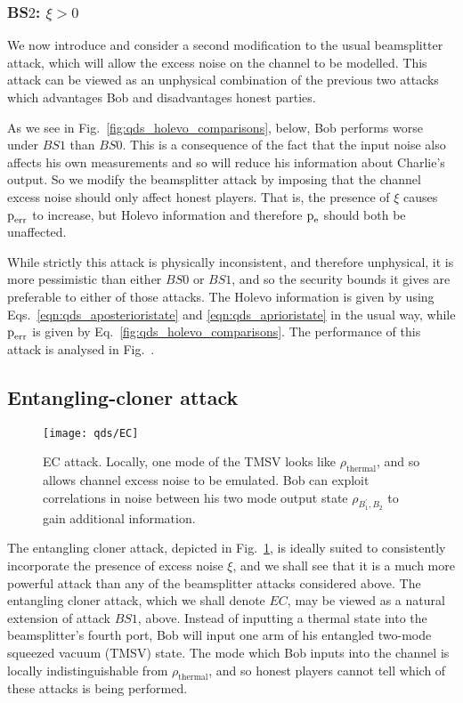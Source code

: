 \subsubsection{BS$2$: $\xi > 0$}\label{sec:qds_bs2}
We now introduce and consider a second modification to the usual beamsplitter attack, which will allow the excess noise on the channel to be modelled. This attack can be viewed as an unphysical combination of the previous two attacks which advantages Bob and disadvantages honest parties.

As we see in Fig.~\ref{fig:qds_holevo_comparisons}, below, Bob performs worse under $BS1$ than $BS0$. This is a consequence of the fact that the input noise also affects his own measurements and so will reduce his information about Charlie's output. So we modify the beamsplitter attack by imposing that the channel excess noise should only affect honest players. That is, the presence of $\xi$ causes $\text{p}_{\text{err}}$ to increase, but Holevo information and therefore $\text{p}_{\text{e}}$ should both be unaffected. 

While strictly this attack is physically inconsistent, and therefore unphysical, it is more pessimistic than either $BS0$ or $BS1$, and so the security bounds it gives are preferable to either of those attacks. The Holevo information is given by using Eqs.~\ref{eqn:qds_aposterioristate} and \ref{eqn:qds_aprioristate} in the usual way, while $\text{p}_{\text{err}}$ is given by Eq.~\ref{fig:qds_holevo_comparisons}. The performance of this attack is analysed in Fig.~.

\subsection{Entangling-cloner attack}
\begin{figure}[htp]
\centering
\texttt{[image: qds/EC]}
\caption{\label{fig:ec_attack} EC attack. Locally, one mode of the TMSV looks like $\rho_{\text{thermal}}$, and so allows channel excess noise to be emulated. Bob can exploit correlations in noise between his two mode output state $\rho_{B_1^\prime, B_2}$ to gain additional information.}
\end{figure}
The entangling cloner attack, depicted in Fig.~\ref{fig:ec_attack}, is ideally suited to consistently incorporate the presence of excess noise $\xi$, and we shall see that it is a much more powerful attack than any of the beamsplitter attacks considered above. The entangling cloner attack, which we shall denote $EC$, may be viewed as a natural extension of attack $BS1$, above. Instead of inputting a thermal state into the beamsplitter's fourth port, Bob will input one arm of his entangled two-mode squeezed vacuum (TMSV) state. The mode which Bob inputs into the channel is locally indistinguishable from $\rho_{\text{thermal}}$, and so honest players cannot tell which of these attacks is being performed. 

